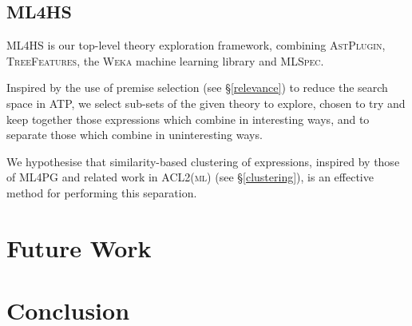 \documentclass[]{article}
\begin{document}
\subsection{\textsc{ML4HS}}\label{ml4hs}

\textsc{ML4HS} is our top-level theory exploration framework, combining \textsc{AstPlugin}, \textsc{TreeFeatures}, the \textsc{Weka} machine learning library and \textsc{MLSpec}.

Inspired by the use of premise selection (see \S \ref{relevance}) to reduce the search space in ATP,
we select sub-sets of the given theory to explore, chosen to try and keep together those expressions which combine in interesting ways, and to separate those which combine in uninteresting ways.

We hypothesise that similarity-based clustering of expressions, inspired by those of \textsc{ML4PG}  and related work in \textsc{ACL2(ml)} (see \S \ref{clustering}), is an effective method for performing this separation.




\section{Future Work}
\label{future}

\iffalse
QuickSpec: extend or extinguish?

Improve and find other use cases/scenarios for clustering and feature extraction

Other directions for Theory Exploration?

How about systems based on term rewriting, logic programming, etc.?
\fi

\section{Conclusion}
\label{conclusion}



\end{document}
